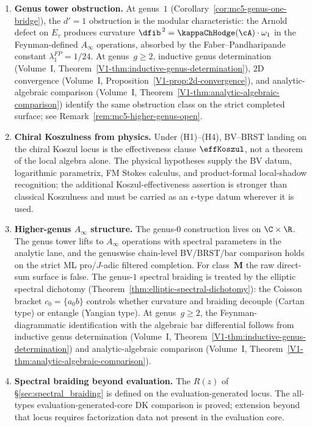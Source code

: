 \begin{enumerate}
\item \textbf{Genus tower obstruction.} At genus~$1$ (Corollary~\ref{cor:mc5-genus-one-bridge}), the $d'=1$ obstruction is the modular characteristic: the Arnold defect on $E_\tau$ produces curvature $\dfib^{\,2} = \kappaChHodge(\cA) \cdot \omega_1$ in the Feynman-defined $A_\infty$ operations, absorbed by the Faber--Pandharipande constant $\lambda_1^{FP} = 1/24$. At genus~$g \geq 2$, inductive genus determination (Volume~I, Theorem~\ref*{V1-thm:inductive-genus-determination}), $2$D convergence (Volume~I, Proposition~\ref*{V1-prop:2d-convergence}), and analytic-algebraic comparison (Volume~I, Theorem~\ref*{V1-thm:analytic-algebraic-comparison}) identify the same obstruction class on the strict completed surface; see Remark~\ref{rem:mc5-higher-genus-open}.

\item \textbf{Chiral Koszulness from physics.} Under (H1)--(H4), BV--BRST
landing on the chiral Koszul locus is the effectiveness clause
\(\effKoszul\), not a theorem of the local algebra alone.  The
physical hypotheses supply the BV datum, logarithmic parametrix, FM
Stokes calculus, and product-formal local-shadow recognition; the
additional Koszul-effectiveness assertion is stronger than classical
Koszulness and must be carried as an \(\epsilon\)-type datum wherever it
is used.

\item \textbf{Higher-genus $A_\infty$ structure.} The genus-$0$ construction lives on $\C \times \R$. The genus tower lifts to $A_\infty$ operations with spectral parameters in the analytic lane, and the genuswise chain-level BV/BRST/bar comparison holds on the strict ML pro/$J$-adic filtered completion. For class~$\mathbf{M}$ the raw direct-sum surface is false. The genus-$1$ spectral braiding is treated by the elliptic spectral dichotomy (Theorem~\ref{thm:elliptic-spectral-dichotomy}): the Coisson bracket $c_0 = \{a{}_0 b\}$ controls whether curvature and braiding decouple (Cartan type) or entangle (Yangian type). At genus~$g \geq 2$, the Feynman-diagrammatic identification with the algebraic bar differential follows from inductive genus determination (Volume~I, Theorem~\ref*{V1-thm:inductive-genus-determination}) and analytic-algebraic comparison (Volume~I, Theorem~\ref*{V1-thm:analytic-algebraic-comparison}).

\item \textbf{Spectral braiding beyond evaluation.} The $R(z)$ of \S\ref{sec:spectral_braiding} is defined on the evaluation-generated locus. The all-types evaluation-generated-core DK comparison is proved; extension beyond that locus requires factorization data not present in the evaluation core.


\end{enumerate}
